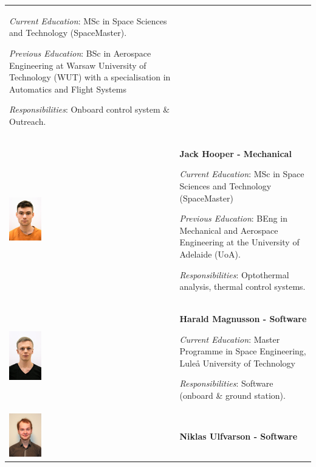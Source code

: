 \begin{longtable}[]{m{} m{}}
\smallskip
\textit{Current Education}: MSc in Space Sciences and Technology (SpaceMaster).

\smallskip
\textit{Previous Education}: BSc in Aerospace Engineering at Warsaw University of Technology (WUT) with a specialisation in Automatics and Flight Systems

\smallskip
\textit{Responsibilities}: Onboard control system \& Outreach.
\bigskip
\\

\includegraphics[width=0.2\textwidth]{0-cover/img/TEAMPICS/Jack_Final.jpg}  & \textbf{Jack Hooper - Mechanical}

\smallskip
\textit{Current Education}: MSc in Space Sciences and Technology (SpaceMaster)

\smallskip
\textit{Previous Education}: BEng in Mechanical and Aerospace Engineering at the University of Adelaide (UoA). 

\smallskip
\textit{Responsibilities}: Optothermal analysis, thermal control systems.
\bigskip
\\


\includegraphics[width=0.2\textwidth]{0-cover/img/TEAMPICS/Harald_final.jpg}  & \textbf{Harald Magnusson - Software}

\smallskip
\textit{Current Education}: Master Programme in Space Engineering, Luleå University of Technology

\smallskip
\textit{Responsibilities}: Software (onboard \& ground station).
\bigskip
\\

\includegraphics[width=0.2\textwidth]{0-cover/img/TEAMPICS/Niklas_final.jpg}  & \textbf{Niklas Ulfvarson - Software}


\end{longtable}
